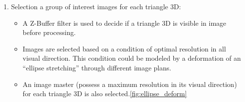 \begin{enumerate}
\item Selection a group of interest images for each triangle 3D:
\begin{itemize}
\item A Z-Buffer filter is used to decide if a triangle 3D is visible in image before processing.
\item Images are selected based on a condition of optimal resolution in all visual direction.
This condition could be modeled by a deformation of an “ellipse stretching” through different image plans.
\item An image master (possess a maximum resolution in its visual direction) for each triangle 3D is also selected.\autoref{fig:ellipse_deform}
\end{itemize}


\end{enumerate}
